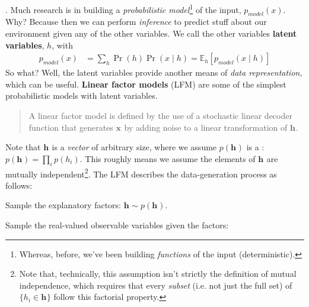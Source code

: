 \documentclass[11pt]{article}
\renewcommand\vec[2][]{\bm{#2}_{#1}}
\newcommand\myspace[1][]{\vspace{#1\bigskipamount}}
\newcommand\p{\Needspace{10\baselineskip} \noindent}
\begin{document}
\myspace
\p {}. Much research is in building a \textit{probabilistic model}\footnote{Whereas, before, we've been building \textit{functions} of the input (deterministic).} of the input, $p_{model}(x)$. Why? Because then we can perform \textit{inference} to predict stuff about our environment given any of the other variables. We call the other variables \textbf{latent variables}, $h$, with
\begin{align}
	p_{model}(x) &= \sum_h \Pr(h)\Pr(x \mid h) = \mathbb{E}_h\left[ p_{model}(x \mid h)\right]
\end{align}
So what? Well, the latent variables provide another means of \textit{data representation}, which can be useful. \textbf{Linear factor models} (LFM) are some of the simplest probabilistic models with latent variables.
\begin{quote}
	A linear factor model is defined by the use of a stochastic linear decoder function that generates $\vec{x}$ by adding noise to a linear transformation of $\vec{h}$. 
\end{quote}
Note that $\vec{h}$ is a \textit{vector} of arbitrary size, where we assume $p(\vec{h})$ is a : $p(\vec{h}) = \prod_i p(h_i)$. This roughly means we assume the elements of $\vec{h}$ are mutually independent\footnote{Note that, technically, this assumption isn't strictly the definition of mutual independence, which requires that every \textit{subset} (i.e. not just the full set) of $\{h_i \in \vec{h}\}$ follow this factorial property.}. The LFM describes the data-generation process as follows:
\begin{compactenum}
	\item Sample the explanatory factors: $\vec{h} \sim p(\vec{h})$.
	\item Sample the real-valued observable variables given the factors:
	
	\graybox{
		\vec{x} = \matr{W} \vec{h} + \vec{b} + \textrm{noise}
		}
\end{compactenum}
\end{document}
